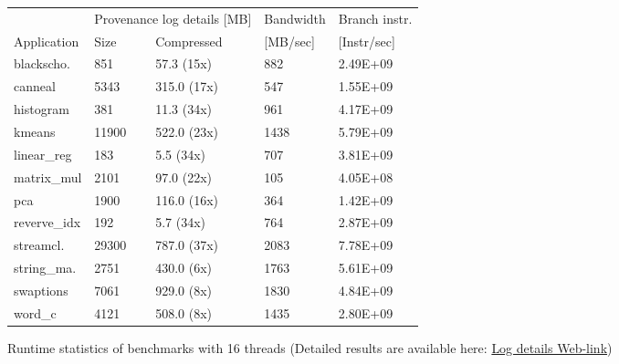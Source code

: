 \begin{figure}[t]
\centering
\myfontsize
{
\begin{tabular}{m{1cm}|m{1cm}|m{1.4cm}|m{1.25cm}|m{1.25cm}}
       & \multicolumn{2}{c|}{ Provenance log details [MB] }   &  Bandwidth & Branch instr. \\
   { Application} & Size & Compressed & [MB/sec] &  [Instr/sec] \\
  \hline \hline
    blackscho.& 851& 57.3 (15x)& 882& 2.49E+09 \\
    canneal& 5343& 315.0 (17x)& 547& 1.55E+09 \\
    histogram& 381& 11.3 (34x)& 961& 4.17E+09 \\
    kmeans& 11900& 522.0 (23x)& 1438& 5.79E+09 \\
    linear\_reg& 183& 5.5 (34x)& 707& 3.81E+09 \\
    matrix\_mul& 2101& 97.0 (22x)& 105& 4.05E+08 \\
    pca& 1900& 116.0 (16x)& 364& 1.42E+09 \\
    reverve\_idx& 192& 5.7 (34x)& 764& 2.87E+09 \\
    streamcl.& 29300& 787.0 (37x)& 2083& 7.78E+09 \\
    string\_ma.& 2751& 430.0 (6x)& 1763& 5.61E+09 \\
    swaptions& 7061& 929.0 (8x)& 1830& 4.84E+09 \\
    word\_c& 4121& 508.0 (8x)& 1435& 2.80E+09 \\

\hline
\end{tabular}
}


\caption{Runtime statistics of benchmarks with 16 threads (Detailed results are available here: \href{https://dl.dropboxusercontent.com/content_link/jLbyMtTMs1bZnBUGPsn8vidcUdrtSZ2TZI5ASfHy4VgG1Ey7Nmm9hT8Qe6gUaIes/file\#measurement_table}{Log details Web-link}) }                                                                                                                                      \label{tab:apps}

\end{figure}

